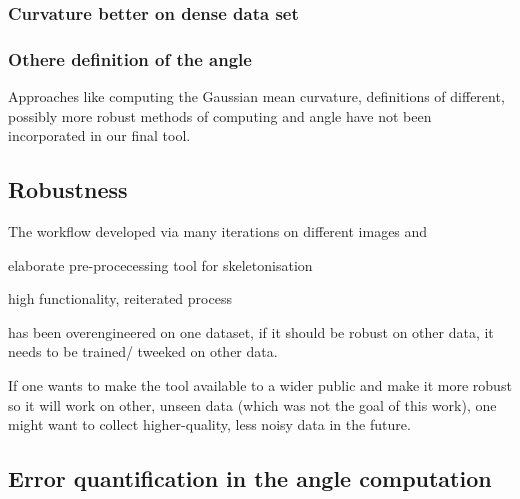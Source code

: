 \subsubsection{Curvature better on dense data set}


\subsubsection{Othere definition of the angle}
Approaches like computing the Gaussian mean curvature, definitions of different, possibly more robust methods of computing and angle %
have not been incorporated in our final tool. 


\subsection{Robustness}

The workflow developed via  many iterations on different images and 

elaborate pre-procecessing tool for skeletonisation

high functionality, reiterated process

has been overengineered on one dataset, if it should be robust on other data, it needs to be trained/ tweeked on other data.



If one wants to make the tool available to a wider public and make it more robust so it will work on other, unseen data (which was not the goal of this work), one might want to collect higher-quality, less noisy data in the future. 






\subsection{Error quantification in the angle computation}





